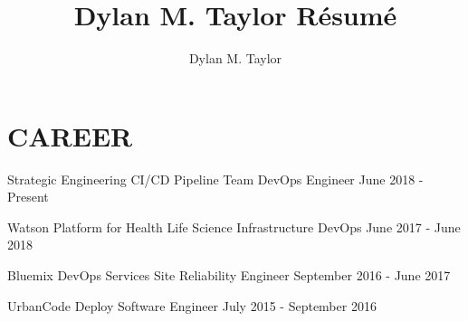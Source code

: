 \documentclass[]{dylan-resume}
\author{Dylan M. Taylor}
\title{Dylan M. Taylor Résumé}
\begin{document}
\lastupdated




\hfill
\begin{minipage}[t]{1.00\textwidth}


\section{CAREER}
\href{https://www.bbt.com/}{}
\hspace*{\fill} \href{https://www.raleighnc.gov/}{}
\vspace{\topsep} %
\begin{tightemize}
\item Strategic Engineering CI/CD Pipeline Team DevOps Engineer \hspace*{\fill}June 2018 - Present
\end{tightemize}
\sectionsep

\href{https://www.ibm.com/}{}
\hspace*{\fill} \href{https://www.rtp.org/}{}
\begin{tightemize}
\item Watson Platform for Health Life Science Infrastructure DevOps \hspace*{\fill}June 2017 - June 2018
\item Bluemix DevOps Services Site Reliability Engineer \hspace*{\fill}September 2016 - June 2017
\item UrbanCode Deploy Software Engineer \hspace*{\fill}July 2015 - September 2016
\end{tightemize}
\sectionsep


\end{minipage}
\end{document}
